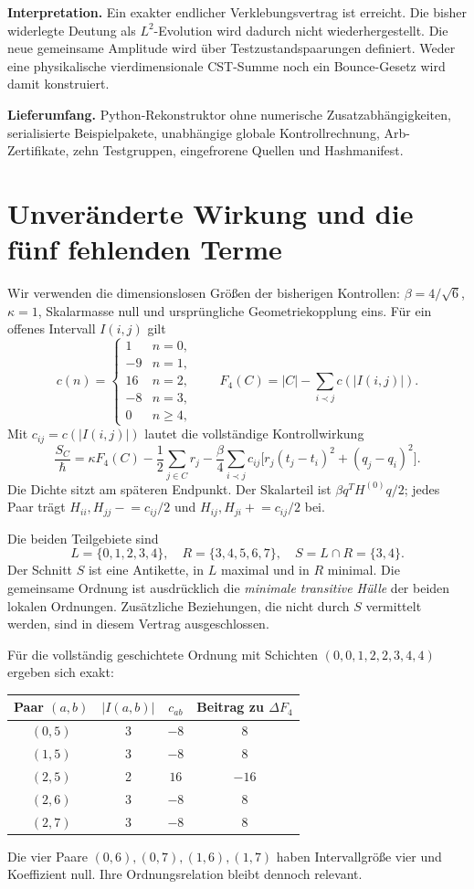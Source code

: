 \documentclass[10pt,a4paper]{article}
\begin{document}
\textbf{Interpretation.} Ein exakter endlicher Verklebungsvertrag ist erreicht.
Die bisher widerlegte Deutung als $L^2$-Evolution wird dadurch nicht wiederhergestellt.
Die neue gemeinsame Amplitude wird über Testzustandspaarungen definiert.
Weder eine physikalische vierdimensionale CST-Summe noch ein Bounce-Gesetz
wird damit konstruiert.

\textbf{Lieferumfang.} Python-Rekonstruktor ohne numerische Zusatzabhängigkeiten,
serialisierte Beispielpakete, unabhängige globale Kontrollrechnung, Arb-Zertifikate,
zehn Testgruppen, eingefrorene Quellen und Hashmanifest.
\newpage

\section{Unveränderte Wirkung und die fünf fehlenden Terme}
Wir verwenden die dimensionslosen Größen der bisherigen Kontrollen:
$\beta=4/\sqrt6$, $\kappa=1$, Skalarmasse null und ursprüngliche
Geometriekopplung eins. Für ein offenes Intervall $I(i,j)$ gilt
\[
 c(n)=
 \begin{cases}
 1&n=0,\\-9&n=1,\\16&n=2,\\-8&n=3,\\0&n\ge4,
 \end{cases}
 \qquad
 F_4(C)=|C|-\sum_{i\prec j}c(|I(i,j)|).
\]
Mit $c_{ij}=c(|I(i,j)|)$ lautet die vollständige Kontrollwirkung
\[
 \frac{S_C}{\hbar}
 =\kappa F_4(C)-\frac12\sum_{j\in C}r_j
 -\frac{\beta}{4}\sum_{i\prec j}c_{ij}
       \bigl[r_j(t_j-t_i)^2+(q_j-q_i)^2\bigr].                 \tag{1}
\]
Die Dichte sitzt am späteren Endpunkt. Der Skalarteil ist
$\beta q^TH^{(0)}q/2$; jedes Paar trägt
$H_{ii},H_{jj}\mathrel{-}=c_{ij}/2$ und
$H_{ij},H_{ji}\mathrel{+}=c_{ij}/2$ bei.

Die beiden Teilgebiete sind
\[
 L=\{0,1,2,3,4\},\quad R=\{3,4,5,6,7\},\quad S=L\cap R=\{3,4\}.
\]
Der Schnitt $S$ ist eine Antikette, in $L$ maximal und in $R$ minimal.
Die gemeinsame Ordnung ist ausdrücklich die \emph{minimale transitive Hülle}
der beiden lokalen Ordnungen. Zusätzliche Beziehungen, die nicht durch
$S$ vermittelt werden, sind in diesem Vertrag ausgeschlossen.

Für die vollständig geschichtete Ordnung mit Schichten
$(0,0,1,2,2,3,4,4)$ ergeben sich exakt:
\begin{center}\begin{tabular}{cccc}\toprule
Paar $(a,b)$ & $|I(a,b)|$ & $c_{ab}$ & Beitrag zu $\Delta F_4$\\\midrule
$(0,5)$ & 3 & $-8$ & $8$\\
$(1,5)$ & 3 & $-8$ & $8$\\
$(2,5)$ & 2 & $16$ & $-16$\\
$(2,6)$ & 3 & $-8$ & $8$\\
$(2,7)$ & 3 & $-8$ & $8$\\\bottomrule
\end{tabular}\end{center}
Die vier Paare $(0,6),(0,7),(1,6),(1,7)$ haben Intervallgröße vier
und Koeffizient null. Ihre Ordnungsrelation bleibt dennoch relevant.
\end{document}
